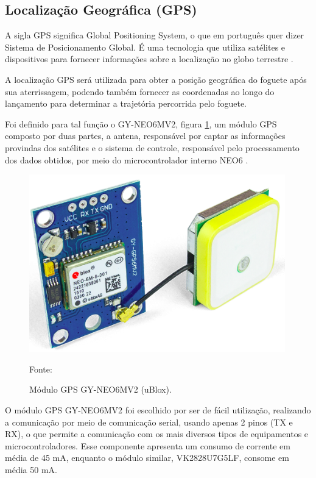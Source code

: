 \subsection{Localização Geográfica (GPS)}

\par A sigla GPS significa Global Positioning System, o que em português quer dizer Sistema de Posicionamento Global. É uma tecnologia que utiliza satélites e dispositivos para fornecer informações sobre a localização no globo terrestre \cite{fisica_GPS_2020}.
\par A localização GPS será utilizada para obter a posição geográfica do foguete após sua aterrissagem, podendo também fornecer as coordenadas ao longo do lançamento para determinar a trajetória percorrida pelo foguete.
\par Foi definido para tal função o GY-NEO6MV2, figura \ref{fig:moduloGPS}, um módulo GPS composto por duas partes, a antena, responsável por captar as informações provindas dos satélites e o sistema de controle, responsável pelo processamento dos dados obtidos, por meio do microcontrolador interno NEO6 \cite{datasheet_GPS}.

\begin{figure}[H]
  \centering
  \includegraphics[scale=0.6]{figuras/moduloGPS.png}
  \caption{Módulo GPS GY-NEO6MV2 (uBlox). }
  {\footnotesize Fonte: \cite{figura_GPS}}
  \label{fig:moduloGPS}
\end{figure}

\par O módulo GPS GY-NEO6MV2 foi escolhido por ser de fácil utilização, realizando a comunicação por meio de comunicação serial, usando apenas 2 pinos (TX e RX), o que permite a comunicação com os mais diversos tipos de equipamentos e microcontroladores. Esse componente apresenta um consumo de corrente em média de 45 mA, enquanto o módulo similar, VK2828U7G5LF, consome em média 50 mA.

